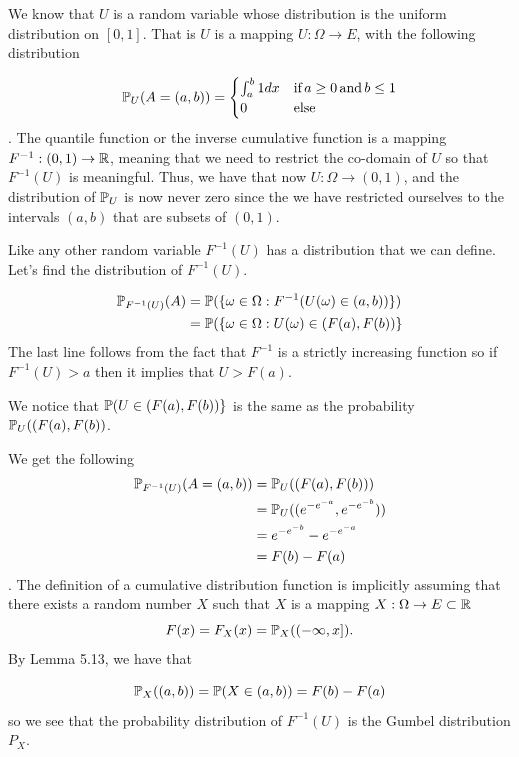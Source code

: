 
We know that $ U$ is a random variable whose distribution is the uniform distribution on $ [0,1]$.
That is $ U$ is a mapping $ U: \Omega \to E$, with the following distribution 

\begin{align*}
    \P_{U} (A=(a,b)) = 
    \begin{cases}
	\int_{a}^{b} 1 dx & \mbox{if} \, a \geq 0 \, \mbox{and} \, b \leq 1\\
	0 & \mbox{else} 
    \end{cases}
\end{align*}
.
The quantile function or the inverse cumulative function is a mapping $ F^{-1}: (0,1) \to \R $,
meaning that we need to restrict the co-domain of $ U$ so that $ F^{-1}(U) $ is meaningful.
Thus, we have that now $ U: \Omega \to (0,1)$, and the distribution of $ \P_{U} $ is now never zero
since the we have restricted ourselves to the intervals $ (a,b)$ that are subsets of $ (0,1)$.

Like any other random variable $ F^{-1} (U)$ has a distribution that we can define. Let's find the
distribution of $ F^{-1} (U)$.

\begin{align*}
    \P_{F^{-1} (U)} (A) &= \P ( \{ \omega \in \Omega: F^{-1} (U(\omega) \in (a,b)) \} )\\
			&= \P( \{ \omega \in \Omega: U(\omega) \in (F(a),F(b)) \} 
\end{align*}
The last line follows from the fact that $ F^{-1} $ is a strictly increasing function so if
$ F^{-1} (U) > a$ then it implies that $ U > F(a)$.

We notice that $\P( U \in (F(a),F(b)) \}  $ is the same as the probability $ \P_{U} ((F(a), F(b))
$.

We get the following
\begin{align*}
    \P_{F^{-1}(U) } (A= (a,b)) &= \P_{U} ((F(a), F(b)))\\
			       &= \P_{U} ((e^{- e^{-a} }, e^{- e^{-b} }  ))\\
			       &= e^{-e^{-b} } - e^{-e^{-a} } \\
			       &= F(b) - F(a)
\end{align*}
.
The definition of a cumulative distribution function is implicitly assuming that there exists a
random number $ X$ such that $ X $ is a mapping $ X: \Omega \to E \subset \R$
\[
    F(x) = F_{X} (x) = \P_{X} ((-\infty, x])
.\] 
By Lemma 5.13, we have that

\[
    \P_{X} ((a,b)) = \P(X \in (a,b)) = F(b) -F(a) 
\] 
so we see that the probability distribution of $ F^{-1}(U)$ is the Gumbel distribution $ P_{X} $.
